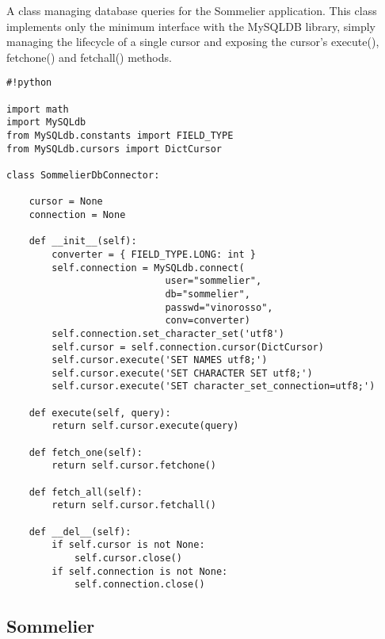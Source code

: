 A class managing database queries for the Sommelier application. This class implements only the minimum interface with the MySQLDB library, simply managing the lifecycle of a single cursor and exposing the cursor's execute(), fetchone() and fetchall() methods.

\begin{verbatim}
#!python

import math
import MySQLdb
from MySQLdb.constants import FIELD_TYPE
from MySQLdb.cursors import DictCursor

class SommelierDbConnector:
    
    cursor = None
    connection = None

    def __init__(self):
        converter = { FIELD_TYPE.LONG: int }
        self.connection = MySQLdb.connect(
                            user="sommelier",
                            db="sommelier",
                            passwd="vinorosso",
                            conv=converter)
        self.connection.set_character_set('utf8')
        self.cursor = self.connection.cursor(DictCursor)
        self.cursor.execute('SET NAMES utf8;')
        self.cursor.execute('SET CHARACTER SET utf8;')
        self.cursor.execute('SET character_set_connection=utf8;')

    def execute(self, query):
        return self.cursor.execute(query)

    def fetch_one(self):
        return self.cursor.fetchone()

    def fetch_all(self):
        return self.cursor.fetchall()

    def __del__(self):
        if self.cursor is not None:
            self.cursor.close()
        if self.connection is not None:
            self.connection.close()
\end{verbatim}

\subsection{Sommelier}

